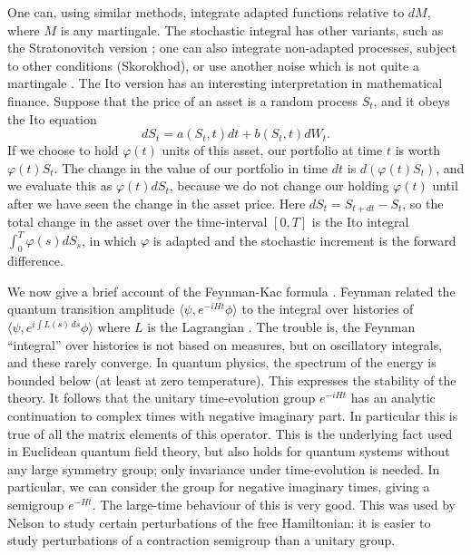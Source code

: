 One can, using similar methods, integrate adapted functions relative to
$dM$, where $M$ is any martingale. The stochastic integral has other
variants, such as the Stratonovitch
version \cite{Wiener2,Nelson4}; one can also integrate non-adapted
processes, subject to
other conditions (Skorokhod), or use another noise which is not quite
a martingale \cite{McShane,Barnett3}.
The Ito version has an interesting interpretation in mathematical finance.
Suppose that the price of an asset is a random process $S_t$, and it
obeys the Ito equation
\[dS_t=a(S_t,t)dt+b(S_t,t)dW_t.\]
If we choose to hold $\varphi(t)$ units of this asset, our portfolio at time
$t$ is worth $\varphi(t)S_t$. The change in the value of our portfolio
in time $dt$ is $d(\varphi(t)S_t)$, and we evaluate this as $\varphi(t)dS_t$,
because we do not change our holding $\varphi(t)$ until after we have seen
the change in the asset price. Here $dS_t=S_{t+dt}-S_t$, so the total
change in the asset over the time-interval $[0,T]$ is the Ito integral
$\int_0^T\varphi(s)dS_s$, in which $\varphi$ is adapted and the stochastic
increment is the forward difference.

We now give a brief account of the Feynman-Kac formula \cite{Kac}.
Feynman related the quantum transition amplitude $\langle\psi,e^{-iHt}\phi
\rangle$ to the integral over histories of $\langle\psi,e^{i\int L(s)\,ds}\phi
\rangle$ where $L$ is the Lagrangian \cite{Feynman}. The trouble is,
the Feynman ``integral'' over histories is not based on measures, but on
oscillatory integrals, and these rarely converge. In quantum
physics, the spectrum of the energy is bounded below (at least
at zero temperature). This expresses the
stability of the theory. It follows that the unitary time-evolution group
$e^{-iHt}$ has an analytic continuation to complex times with negative
imaginary part. In particular this is true of all the matrix elements
of this operator. This is the underlying fact used in Euclidean
quantum field theory, but also holds for quantum systems without any large
symmetry group; only invariance under time-evolution is needed. In
particular, we can consider the group for negative imaginary times,
giving a semigroup $e^{-Ht}$. The
large-time behaviour of this is very good. This was used by Nelson
\cite{Nelson} to study certain perturbations of the free Hamiltonian: it is
easier to study perturbations of a contraction
semigroup than a unitary group.

